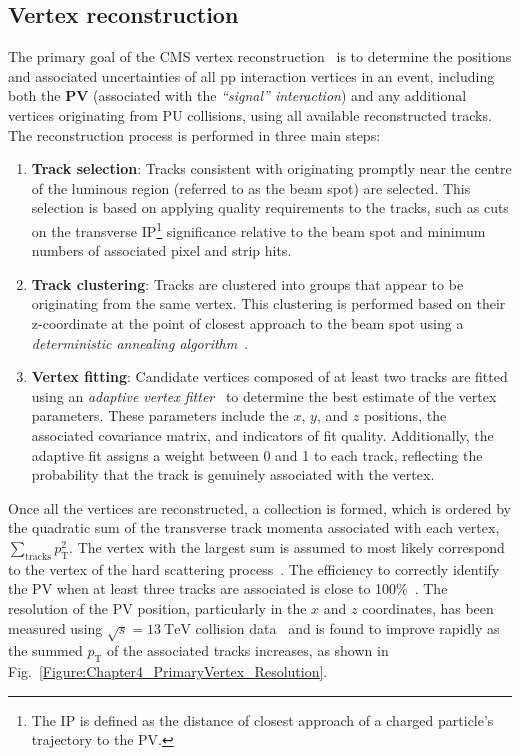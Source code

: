 \subsection{Vertex reconstruction}
\label{Section:Chapter4_Vertex_reconstruction}

The primary goal of the \ac{CMS} vertex reconstruction~\cite{CMS_TrackerPerformance_2014} is to determine the positions and associated uncertainties of all pp interaction vertices in an event, including both the \textbf{\ac{PV}} (associated with the \textit{``signal'' interaction}) and any additional vertices originating from \ac{PU} collisions, using all available reconstructed tracks. The reconstruction process is performed in three main steps: 

\begin{enumerate}
    \item \textbf{Track selection}: Tracks consistent with originating promptly near the centre of the luminous region (referred to as the beam spot) are selected. This selection is based on applying quality requirements to the tracks, such as cuts on the transverse \ac{IP}\footnote{The \ac{IP} is defined as the distance of closest approach of a charged particle’s trajectory to the \ac{PV}.} significance relative to the beam spot and minimum numbers of associated pixel and strip hits.
    \item \textbf{Track clustering}: Tracks are clustered into groups that appear to be originating from the same vertex. This clustering is performed based on their z-coordinate at the point of closest approach to the beam spot using a \textit{deterministic annealing algorithm}~\cite{DeterministicAnnealing}.
    \item \textbf{Vertex fitting}: Candidate vertices composed of at least two tracks are fitted using an \textit{adaptive vertex fitter}~\cite{VertexFitting_2006,VertexFitting_2007} to determine the best estimate of the vertex parameters. These parameters include the $x$, $y$, and $z$ positions, the associated covariance matrix, and indicators of fit quality. Additionally, the adaptive fit assigns a weight between 0 and 1 to each track, reflecting the probability that the track is genuinely associated with the vertex.
\end{enumerate}

Once all the vertices are reconstructed, a collection is formed, which is ordered by the quadratic sum of the transverse track momenta associated with each vertex, $\sum_{\text{tracks}} p_{\mathrm{T}}^2$. The vertex with the largest sum is assumed to most likely correspond to the vertex of the hard scattering process~\cite{ParticleFlow}. The efficiency to correctly identify the \ac{PV} when at least three tracks are associated is close to 100\%~\cite{CMS_TrackerPerformance_2014}. The resolution of the \ac{PV} position, particularly in the $x$ and $z$ coordinates, has been measured using $\sqrt{s} = 13\ \mathrm{TeV}$ collision data~\cite{PrimaryVertex_Resolution} and is found to improve rapidly as the summed $p_{\mathrm{T}}$ of the associated tracks increases, as shown in Fig.~\ref{Figure:Chapter4_PrimaryVertex_Resolution}.

